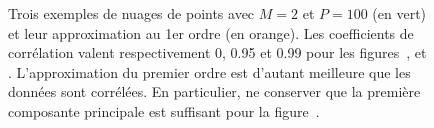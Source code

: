     \begin{figure}[]
        \centering
        \caption{Trois exemples de nuages de points avec $M=2$ et $P=100$ (en vert) et leur approximation au 1er ordre (en orange). Les coefficients de corrélation valent respectivement 0, 0.95 et 0.99 pour les figures~\protect{}, \protect{} et \protect{}. L'approximation du premier ordre est d'autant meilleure que les données sont corrélées. En particulier, ne conserver que la première composante principale est suffisant pour la figure~\protect{}.
            \protect\label{fig-pca-data-corr}}
    \end{figure}

